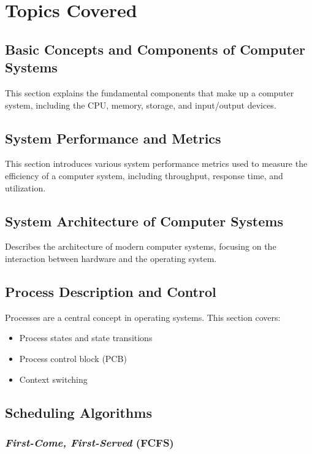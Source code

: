 \documentclass[12pt]{article}
\begin{document}
\section{Topics Covered}

\subsection{Basic Concepts and Components of Computer Systems}
This section explains the fundamental components that make up a computer system, including the CPU, memory, storage, and input/output devices.

\subsection{System Performance and Metrics}
This section introduces various system performance metrics used to measure the efficiency of a computer system, including throughput, response time, and utilization.

\subsection{System Architecture of Computer Systems}
Describes the architecture of modern computer systems, focusing on the interaction between hardware and the operating system.

\subsection{Process Description and Control}
Processes are a central concept in operating systems. This section covers:
\begin{itemize}
    \item Process states and state transitions
    \item Process control block (PCB)
    \item Context switching
\end{itemize}

\subsection{Scheduling Algorithms}


\subsubsection{\textit{First-Come, First-Served} (FCFS)}
\end{document}
